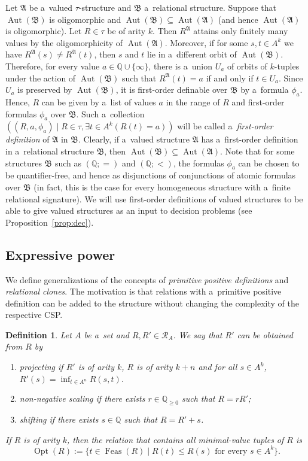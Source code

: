 \documentclass[preprint,12pt]{elsarticle}
\newcommand{\Q}{\mathbb Q}
\newcommand{\bA}{{\mathfrak A}}
\newcommand{\bB}{{\mathfrak B}}
\DeclareMathOperator{\Aut}{Aut}
\DeclareMathOperator{\Opt}{Opt}
\DeclareMathOperator{\Feas}{Feas}
\newtheorem{definition}[theorem]{Definition}
\begin{document}
Let $\bA$ be a~valued $\tau$-structure and $\bB$ a~relational structure. Suppose that $\Aut(\bB)$ is oligomorphic and $\Aut(\bB) \subseteq \Aut(\bA)$ (and hence $\Aut(\bA)$ is oligomorphic). Let $R \in \tau$ be of arity $k$. Then $R^{\bA}$ attains only finitely many values
by the oligomorphicity of $\Aut(\bA)$. Moreover, if for some $s,t \in A^k$ we have $R^{\bA}(s) \neq R^{\bA}(t)$, then $s$ and $t$ lie in a~different orbit of $\Aut(\bB)$. Therefore, for every value $a \in \Q \cup \{\infty\}$, there is a~union $U_a$ of orbits of $k$-tuples under the action of $\Aut(\bB)$ such that $R^{\bA}(t) = a$ if and only if $t \in U_a$. Since $U_a$ is preserved by $\Aut(\bB)$, it is first-order definable over $\bB$ by a~formula $\phi_a$.
Hence,  $R$ can be given by a~list of values $a$ in the range of $R$ and first-order formulas $\phi_a$ over $\bB$. Such a~collection $((R, a, \phi_a)\mid R \in \tau, \exists t \in A^k (R(t)=a))$ will be called a~\emph{first-order definition} of $\bA$ in $\bB$. Clearly, if a~valued structure $\bA$ has a~first-order definition in a~relational structure $\bB$, then $\Aut(\bB) \subseteq \Aut(\bA)$. Note that for some structures $\bB$ such as $(\Q;=)$ and $(\Q; <)$, the formulas $\phi_a$ can be chosen to be quantifier-free, and hence as disjunctions of conjunctions of atomic formulas over $\bB$ (in fact, this is the case for every homogeneous structure with a~finite relational signature). We will use first-order definitions of valued structures to be able to give valued structures as an input to decision problems (see
Proposition~\ref{prop:dec}).


\subsection{Expressive power}
We define generalizations of the concepts of \emph{primitive positive definitions} and \emph{relational clones}.
The motivation is that relations with a~primitive positive definition can be added to the structure without changing the complexity of the respective CSP. 

\begin{definition}
Let $A$ be a~set and $R,R' \in {\mathscr R}_A$.
We say that $R'$ can be obtained from $R$ by 
\begin{enumerate}
\item \emph{projecting} if $R'$ is of arity $k$, $R$ is of arity $k+n$ and for all $s \in A^k$, $R'(s) = \inf_{t \in A^n} R(s,t)$.
\item \emph{non-negative scaling} 
 if there exists $r \in {\mathbb Q}_{\geq 0}$ such that $R = r R'$;
 \item  \emph{shifting} if there exists $s \in {\mathbb Q}$ such that $R = R' + s$. 
\end{enumerate}
If $R$ is of arity $k$, then the relation that contains all minimal-value tuples of $R$ is 
\[\Opt(R) := \{t \in \Feas(R) \mid R(t) \leq R(s) \text{ for every } s \in A^k\}.\]
\end{definition}
\end{document}
